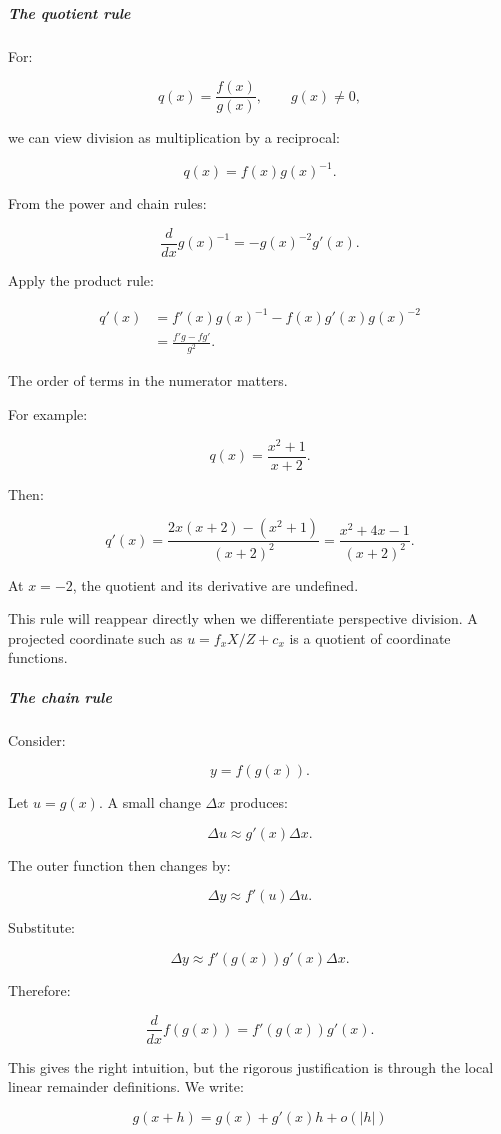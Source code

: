 \subparagraph{The quotient rule}\label{01-foundations-i-ch020-the-quotient-rule}

For:

\[
q(x)=\frac{f(x)}{g(x)},\qquad g(x)\ne0,
\]

we can view division as multiplication by a reciprocal:

\[
q(x)=f(x)g(x)^{-1}.
\]

From the power and chain rules:

\[
\frac d{dx}g(x)^{-1} =-g(x)^{-2}g'(x).
\]

Apply the product rule:

\[
\begin{aligned} q'(x) &=f'(x)g(x)^{-1} -f(x)g'(x)g(x)^{-2}\\ &=\boxed{\frac{f'g-fg'}{g^2}}. \end{aligned}
\]

The order of terms in the numerator matters.

For example:

\[
q(x)=\frac{x^2+1}{x+2}.
\]

Then:

\[
q'(x)= \frac{2x(x+2)-(x^2+1)}{(x+2)^2} = \frac{x^2+4x-1}{(x+2)^2}.
\]

At \(x=-2\), the quotient and its derivative are undefined.

This rule will reappear directly when we differentiate perspective division. A projected coordinate such as \(u=f_xX/Z+c_x\) is a quotient of coordinate functions.

\subparagraph{The chain rule}\label{01-foundations-i-ch020-the-chain-rule}

Consider:

\[
y=f(g(x)).
\]

Let \(u=g(x)\). A small change \(\Delta x\) produces:

\[
\Delta u\approx g'(x)\Delta x.
\]

The outer function then changes by:

\[
\Delta y\approx f'(u)\Delta u.
\]

Substitute:

\[
\Delta y\approx f'(g(x))g'(x)\Delta x.
\]

Therefore:

\[
\boxed{\frac d{dx}f(g(x))=f'(g(x))g'(x)}.
\]

This gives the right intuition, but the rigorous justification is through the local linear remainder definitions. We write:

\[
g(x+h)=g(x)+g'(x)h+o(|h|)
\]

